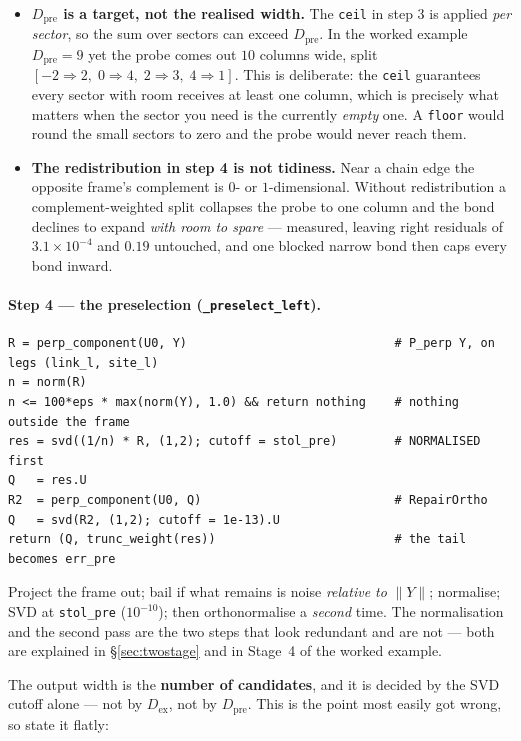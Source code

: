 \documentclass[11pt,a4paper]{article}
\newcommand{\Dex}{D_{\mathrm{ex}}}
\newcommand{\Dpre}{D_{\mathrm{pre}}}
\newcommand{\code}[1]{\texttt{\small #1}}
\begin{document}
\begin{itemize}[leftmargin=1.2em]
\item \textbf{$\Dpre$ is a target, not the realised width.} The \code{ceil} in step 3 is applied
\emph{per sector}, so the sum over sectors can exceed $\Dpre$. In the worked example
$\Dpre = 9$ yet the probe comes out $10$ columns wide, split
$[-2 \Rightarrow 2,\; 0 \Rightarrow 4,\; 2 \Rightarrow 3,\; 4 \Rightarrow 1]$. This is
deliberate: the \code{ceil} guarantees every sector with room receives at least one column,
which is precisely what matters when the sector you need is the currently \emph{empty} one. A
\code{floor} would round the small sectors to zero and the probe would never reach them.
\item \textbf{The redistribution in step 4 is not tidiness.} Near a chain edge the opposite
frame's complement is $0$- or $1$-dimensional. Without redistribution a complement-weighted
split collapses the probe to one column and the bond declines to expand \emph{with room to
spare} --- measured, leaving right residuals of $3.1\times10^{-4}$ and $0.19$ untouched, and one
blocked narrow bond then caps every bond inward.
\end{itemize}

\paragraph{Step 4 --- the preselection (\code{\_preselect\_left}).}
\begin{lstlisting}[style=jl]
R = perp_component(U0, Y)                             # P_perp Y, on legs (link_l, site_l)
n = norm(R)
n <= 100*eps * max(norm(Y), 1.0) && return nothing    # nothing outside the frame
res = svd((1/n) * R, (1,2); cutoff = stol_pre)        # NORMALISED first
Q   = res.U
R2  = perp_component(U0, Q)                           # RepairOrtho
Q   = svd(R2, (1,2); cutoff = 1e-13).U
return (Q, trunc_weight(res))                         # the tail becomes err_pre
\end{lstlisting}
Project the frame out; bail if what remains is noise \emph{relative to} $\|Y\|$; normalise;
SVD at \code{stol\_pre} ($10^{-10}$); then orthonormalise a \emph{second} time. The
normalisation and the second pass are the two steps that look redundant and are not --- both are
explained in \S\ref{sec:twostage} and in Stage~4 of the worked example.

The output width is the \textbf{number of candidates}, and it is decided by the SVD cutoff alone
--- not by $\Dex$, not by $\Dpre$. This is the point most easily got wrong, so state it flatly:
\end{document}
